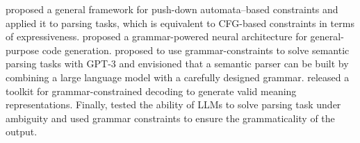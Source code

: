 \citet{deutsch-etal-2019-general} proposed a general framework for push-down automata--based constraints and applied it to parsing tasks, which is equivalent to CFG-based constraints in terms of expressiveness.
\citet{yin-neubig-2017-syntactic} proposed a grammar-powered neural architecture for general-purpose code generation.
\citet{shin-etal-2021-constrained} proposed to use grammar-constraints to solve semantic parsing tasks with GPT-3 and envisioned that a semantic parser can be built by combining a large language model with a carefully designed grammar.
\citet{roy2022benchclamp} released a toolkit for grammar-constrained decoding to generate valid meaning representations.
Finally, \citet{stengeleskin2023zero} tested the ability of LLMs to solve parsing task under ambiguity and used grammar constraints to ensure the grammaticality of the output.



